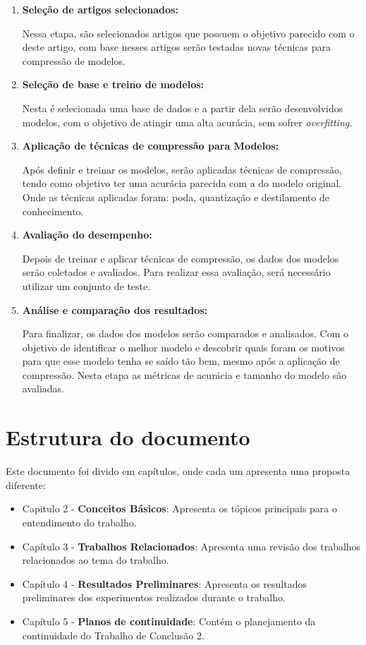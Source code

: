 \begin{enumerate}
	\item \textbf{Seleção de artigos selecionados:}

		Nessa etapa, são selecionados artigos que possuem o objetivo parecido com o deste artigo,
		com base nesses artigos serão testadas novas técnicas para compressão de modelos.

	\item \textbf{Seleção de base e treino de modelos:}

		Nesta é selecionada uma base de dados e a partir dela serão desenvolvidos modelos,
		com o objetivo de atingir uma alta acurácia, sem sofrer \textit{overfitting}.

	\item \textbf{Aplicação de técnicas de compressão para Modelos:}

		Após definir e treinar os modelos, serão aplicadas técnicas de compressão, tendo como
		objetivo ter uma acurácia parecida com a do modelo original. Onde as técnicas aplicadas
		foram: poda, quantização e destilamento de conhecimento.

	\item \textbf{Avaliação do desempenho:}

		Depois de treinar e aplicar técnicas de compressão, os dados dos modelos serão coletados e
		avaliados. Para realizar essa avaliação, será necessário utilizar um conjunto de teste.

	\item \textbf{Análise e comparação dos resultados:}

		Para finalizar, os dados dos modelos serão comparados e analisados. Com o objetivo de
		identificar o melhor modelo e descobrir quais foram os motivos para que esse modelo tenha se
		saído tão bem, mesmo após a aplicação de compressão. Nesta etapa as métricas de acurácia e
		tamanho do modelo são avaliadas.

\end{enumerate}

\section{Estrutura do documento}
Este documento foi divido em capítulos, onde cada um apresenta uma proposta diferente:
\begin{itemize}
	\item Capitulo 2 - \textbf{Conceitos Básicos}: Apresenta os tópicos principais para o entendimento
		do trabalho.
	\item Capítulo 3 - \textbf{Trabalhos Relacionados}: Apresenta uma revisão dos trabalhos
		relacionados ao tema do trabalho.
	\item Capítulo 4 - \textbf{Resultados Preliminares}: Apresenta os resultados preliminares dos
		experimentos realizados durante o trabalho.
	\item Capítulo 5 - \textbf{Planos de continuidade}: Contém o planejamento da continuidade do
		Trabalho de Conclusão 2.
\end{itemize}

